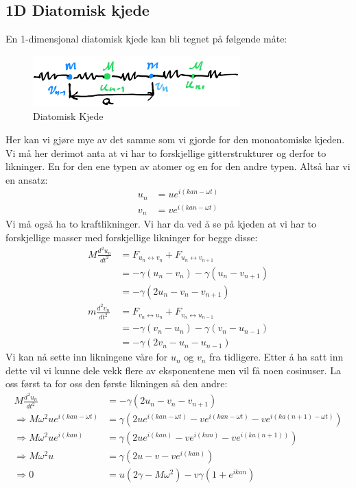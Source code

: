 \documentclass{article}
\begin{document}
\subsection{1D Diatomisk kjede}
En 1-dimensjonal diatomisk kjede kan bli tegnet på følgende måte:
\begin{figure}[H]
    \centering
    \includegraphics[width=0.5\linewidth]{bilder/diatomisk_kjede.png}
    \caption{Diatomisk Kjede}
    \label{fig:diatomisk_kjede}
\end{figure}
Her kan vi gjøre mye av det samme som vi gjorde for den monoatomiske kjeden. Vi må her derimot anta at vi har to forskjellige gitterstrukturer og derfor to likninger. En for den ene typen av atomer og en for den andre typen. Altså har vi en ansatz:
\begin{align}
    \label{eq:diatomisk_kjede_ansatz}
    u_n &= u e^{i (kan - \omega t)} \\
    v_n &= v e^{i (kan - \omega t)}
\end{align}
Vi må også ha to kraftlikninger. Vi har da ved å se på kjeden at vi har to forskjellige masser med forskjellige likninger for begge disse:
\begin{align*}
    M \frac{d^2 u_n}{dt^2} &= F_{u_n \leftrightarrow v_n} + F_{u_n \leftrightarrow v_{n+1}}\\
                           &= -\gamma( u_n - v_n) -\gamma( u_n - v_{n+1}) \\
                           &= -\gamma(2u_n - v_{n} - v_{n+1}) \\
    m \frac{d^2 v_n}{dt^2} &= F_{v_n \leftrightarrow u_n} + F_{v_n \leftrightarrow u_{n-1}}\\
                           &= -\gamma( v_n - u_n) -\gamma( v_n - u_{n-1}) \\
                           &= -\gamma(2v_n - u_{n} - u_{n-1})
\end{align*}
Vi kan nå sette inn likningene våre for $u_n$ og $v_n$ fra tidligere. Etter å ha satt inn dette vil vi kunne dele vekk flere av eksponentene men vil få noen cosinuser. La oss først ta for oss den første likningen så den andre:
\begin{align*}
    M \frac{d^2 u_n}{dt^2} &= -\gamma(2u_n - v_{n} - v_{n+1})\\
    \Rightarrow M \omega^2 u e^{i(kan - \omega t)} &= \gamma\left(2 u e^{i(kan - \omega t)} - v e^{i(kan - \omega t)} - v e^{i(ka(n+1) - \omega t)}\right) \\
    \Rightarrow M \omega^2 u e^{i(kan)} &= \gamma\left(2 u e^{i(kan)} - v e^{i(kan)} - v e^{i(ka(n+1))}\right) \\
    \Rightarrow M \omega^2 u  &= \gamma\left(2 u - v  - v e^{i(kan)}\right) \\
    \Rightarrow 0 &= u (2 \gamma - M \omega^2) - v \gamma (1 + e^{i kan}) \\
\end{align*}
\end{document}

